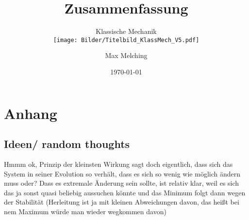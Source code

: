 

\usepackage{subfiles}


\makeindex


\begin{titlepage}
\centering
\title{Zusammenfassung}

\subtitle{Klassische Mechanik\\

\vspace{-4\baselineskip}
\texttt{[image: Bilder/Titelbild\_KlassMech\_V5.pdf]}
\vspace{-\baselineskip}
}

\author{Max Melching}
\date{\today}
\setcounter{page}{0}
\maketitle
\end{titlepage}
\newpage
{}
\pagestyle{plain.scrheadings}

\tableofcontents

\newpage

\listoffigures

\newpage



\pagestyle{scrheadings}













\appendix

\chapter{Anhang}

	\section{Ideen/ random thoughts}
Hmmm ok, Prinzip der kleinsten Wirkung sagt doch eigentlich, dass sich das System in seiner Evolution so verhält, dass es sich so wenig wie möglich ändern muss oder? Dass es extremale Änderung sein sollte, ist relativ klar, weil es sich das ja sonst quasi beliebig aussuchen könnte und das Minimum folgt dann wegen der Stabilität (Herleitung ist ja mit kleinen Abweichungen davon, das heißt bei nem Maximum würde man wieder wegkommen davon)


